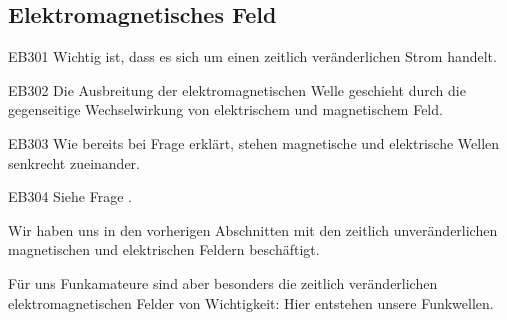 \subsection{Elektromagnetisches Feld}


\begin{sol}{EB301}
Wichtig ist, dass es sich um einen zeitlich veränderlichen Strom handelt.
\end{sol}

\begin{sol}{EB302}
Die Ausbreitung der elektromagnetischen Welle geschieht durch die gegenseitige Wechselwirkung von elektrischem und magnetischem Feld.
\end{sol}

\begin{sol}{EB303}
Wie bereits bei Frage  erklärt, stehen magnetische und elektrische Wellen senkrecht zueinander.
\end{sol}

\begin{sol}{EB304}
  Siehe Frage .
\end{sol}

\begin{ohmchapter}
  Wir haben uns in den vorherigen Abschnitten mit den zeitlich unveränderlichen magnetischen und  elektrischen Feldern beschäftigt.

  Für uns Funkamateure sind aber besonders die zeitlich veränderlichen elektromagnetischen Felder von Wichtigkeit: Hier entstehen unsere Funkwellen.
\end{ohmchapter}   

